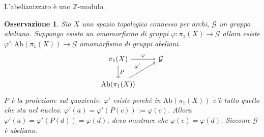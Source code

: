\documentclass{article}
\newtheorem{osservation}[theorem]{Osservazione}
\newcommand{\Z}{\mathbb{Z}}
\renewcommand{\phi}{\varphi}
\newcommand{\Ab}[1]{\mathrm{Ab}( #1 )}
\begin{document}
L'abelianizzato è uno $ \Z $-modulo.

\begin{osservation}
  Sia $ X $ uno spazio topologico connesso per archi, $ \mathcal{G} $ un gruppo abeliano. Suppongo esista un omomorfismo
  di gruppi $ \phi: \pi_1(X) \to \mathcal{G} $ allora esiste $ \phi' : \Ab{\pi_1(X)} \to \mathcal{G} $ omomorfismo di gruppi abeliani.
  \[
    \begin{tikzcd}
      \pi_1(X) \arrow{r}{\phi} \arrow{d}{P} & \mathcal{G} \\
      \Ab{\pi_1(X)} \arrow{ur}{\phi'}
    \end{tikzcd}
  \]
  $ P $ è la proiezione sul quoziente. $ \phi' $ esiste perchè in $ \Ab{\pi_1(X)} $ c'è tutto quello che sta nel nucleo.
  $ \phi'(a) = \phi'(P(c)) := \phi(c) $.
  Allora $ \phi'(a) = \phi'(P(d)) = \phi(d) $, devo mostrare che $ \phi(c) = \phi(d) $. Siccome $ \mathcal{G} $ è abeliano.
\end{osservation}


\printindex
\end{document}
